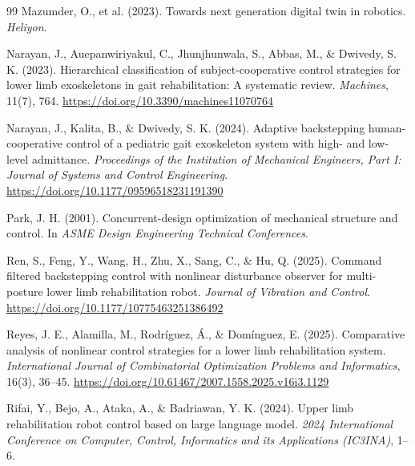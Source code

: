 \documentclass[a4paper,12pt]{article}
\begin{document}
\begin{thebibliography}{99}
    Mazumder, O., et al. (2023).
    \newblock Towards next generation digital twin in robotics.
    \newblock \emph{Heliyon}.

    Narayan, J., Auepanwiriyakul, C., Jhunjhunwala, S., Abbas, M., \& Dwivedy, S. K. (2023).
    \newblock Hierarchical classification of subject-cooperative control strategies for lower limb exoskeletons in gait rehabilitation: A systematic review.
    \newblock \emph{Machines}, 11(7), 764.
    \newblock \url{https://doi.org/10.3390/machines11070764}

    Narayan, J., Kalita, B., \& Dwivedy, S. K. (2024).
    \newblock Adaptive backstepping human-cooperative control of a pediatric gait exoskeleton system with high- and low-level admittance.
    \newblock \emph{Proceedings of the Institution of Mechanical Engineers, Part I: Journal of Systems and Control Engineering}.
    \newblock \url{https://doi.org/10.1177/09596518231191390}

    Park, J. H. (2001).
    \newblock Concurrent-design optimization of mechanical structure and control.
    \newblock In \emph{ASME Design Engineering Technical Conferences}.

    Ren, S., Feng, Y., Wang, H., Zhu, X., Sang, C., \& Hu, Q. (2025).
    \newblock Command filtered backstepping control with nonlinear disturbance observer for multi-posture lower limb rehabilitation robot.
    \newblock \emph{Journal of Vibration and Control}.
    \newblock \url{https://doi.org/10.1177/10775463251386492}

    Reyes, J. E., Alamilla, M., Rodríguez, Á., \& Domínguez, E. (2025).
    \newblock Comparative analysis of nonlinear control strategies for a lower limb rehabilitation system.
    \newblock \emph{International Journal of Combinatorial Optimization Problems and Informatics}, 16(3), 36--45.
    \newblock \url{https://doi.org/10.61467/2007.1558.2025.v16i3.1129}

    Rifai, Y., Bejo, A., Ataka, A., \& Badriawan, Y. K. (2024).
    \newblock Upper limb rehabilitation robot control based on large language model.
    \newblock \emph{2024 International Conference on Computer, Control, Informatics and its Applications (IC3INA)}, 1--6.


\end{thebibliography}
\end{document}
